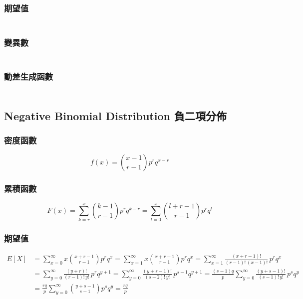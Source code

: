 \documentclass{article}
\begin{document}
\subsubsection{期望值}
\begin{align*}
\end{align*}

\subsubsection{變異數}
\begin{align*}
\end{align*}

\subsubsection{動差生成函數}
\begin{align*}
\end{align*}

\subsection{Negative Binomial Distribution 負二項分佈}

\bigskip
\subsubsection{密度函數}
\[ f(x)=\binom{x-1}{r-1}p^r q^{x-r} \]

\subsubsection{累積函數}
\[ F(x)=\sum_{k=r}^x{\binom{k-1}{r-1}p^r q^{k-r}}
       =\sum_{l=0}^x{\binom{l+r-1}{r-1}p^r q^l} \]

\subsubsection{期望值}
\begin{align*}
E[X]
& = \sum_{x=0}^\infty{x\binom{x+r-1}{r-1}p^r q^x}
  = \sum_{x=1}^\infty{x\binom{x+r-1}{r-1}p^r q^x}
  = \sum_{x=1}^\infty{\frac{(x+r-1)!}{(r-1)!\,(x-1)!}\,p^r q^x} \\
& = \sum_{y=0}^\infty{\frac{(y+r)!}{(r-1)!\,y!}\,p^r q^{y+1}}
  = \sum_{y=0}^\infty{\frac{(y+s-1)!}{(s-2)!\,y!}\,p^{s-1}q^{y+1}}
  = \frac{(s-1)q}{p}\sum_{y=0}^\infty{\frac{(y+s-1)!}{(s-1)!\,y!}\,p^s q^y} \\
& = \frac{rq}{p}\sum_{y=0}^\infty{\binom{y+s-1}{s-1}p^s q^y}
  = \frac{rq}{p}
\end{align*}
\end{document}
